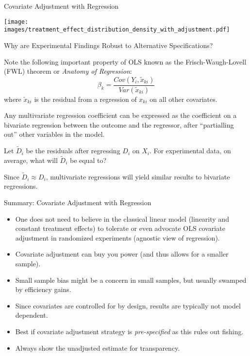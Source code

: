 \documentclass{beamer}
\numberwithin{equation}{section}
\begin{document}
\begin{frame}{Covariate Adjustment with Regression}

 \centering
    \texttt{[image: images/treatment\_effect\_distribution\_density\_with\_adjustment.pdf]}

\end{frame}

\begin{frame}{Why are Experimental Findings Robust to Alternative
Specifications?}

Note the following important property of OLS known as
the Frisch-Waugh-Lovell (FWL) theorem or \emph{Anatomy of Regression}:
\[\beta_k = \frac{Cov(Y_i, \tilde{x}_{ki})}{Var(\tilde{x}_{ki})}\] where
$\tilde{x}_{ki}$ is the residual from a regression of $x_{ki}$ on all
other covariates. \pause

Any multivariate regression coefficient can be expressed as the
coefficient on a bivariate regression between the outcome and the
regressor, after ``partialling out'' other variables in the model.
\pause

Let $\tilde{D}_i$ be the residuals after regressing $D_i$ on $X_i$. For
experimental data, on average, what will $\tilde{D}_i$ be equal to?
\pause

Since $\tilde{D}_i \approx D_i$, multivariate regressions will yield
similar results to bivariate regressions.

\end{frame}

\begin{frame}{Summary: Covariate Adjustment with Regression}

\small
\begin{itemize}
\itemsep1pt\parskip0pt

\item One does not need to believe in the classical linear model (linearity and constant treatment effects) to tolerate or even advocate OLS covariate adjustment in randomized experiments (agnostic view of regression).\medskip
\item Covariate adjustment can buy you power (and thus allows for a smaller sample).\medskip
\item
  Small sample bias might be a concern in small samples, but usually
  swamped by efficiency gains.\medskip
\item Since covariates are controlled for by design, results are typically not model dependent. \medskip
\item
  Best if covariate adjustment strategy is \emph{pre-specified} as this
  rules out fishing.\medskip
\item
  Always show the unadjusted estimate for transparency.
\end{itemize}

\end{frame}
\end{document}

